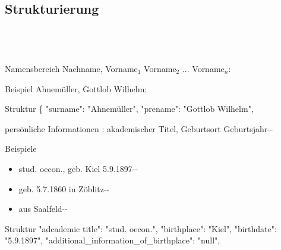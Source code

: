 \documentclass[12pt]{beamer}
\begin{document}
\begin{large}
\section{Strukturierung}
 \subsection*{~}
 
\begin{frame}{Namensbereich}
 Nachname, Vorname$_1$ Vorname$_2$ ... Vorname$_n$:

 \vspace*{\fill}
 \begin{block}{Beispiel}
 \normalsize Ahnemüller, Gottlob Wilhelm:
 \end{block}

 \begin{block}{Struktur}
  \normalsize
  \{
  \newline
  \hspace*{0.5cm}
  "{}surname"{}: "{}Ahnemüller"{},
  \newline
  \hspace*{0.5cm}    
  "{}prename"{}: "{}Gottlob Wilhelm"{},
 \end{block} 
\end{frame}


\begin{frame}{persönliche Informationen}
 : akademischer Titel, Geburtsort Geburtsjahr-{}-

 \vspace*{\fill}
 \begin{block}{Beispiele}
  \normalsize
  \begin{itemize}
   \item stud. oecon., geb. Kiel 5.9.1897-{}-
   \item geb. 5.7.1860 in  Zöblitz-{}-
   \item aus Saalfeld-{}-
  \end{itemize}
 \end{block}
 
 \begin{block}{Struktur}
  \normalsize
  \hspace*{0.5cm}
  "{}adcademic title"{}: "{}stud. oecon."{},
  \newline 
  \hspace*{0.5cm}    
  "{}birthplace"{}: "{}Kiel"{},
  \newline
  \hspace*{0.5cm}
  "{}birthdate"{}: "{}5.9.1897"{},    
  \newline
  \hspace*{0.5cm}
  "{}additional\_information\_of\_birthplace"{}: "{}null"{},
 \end{block} 
\end{frame}


\end{large}
\end{document}
